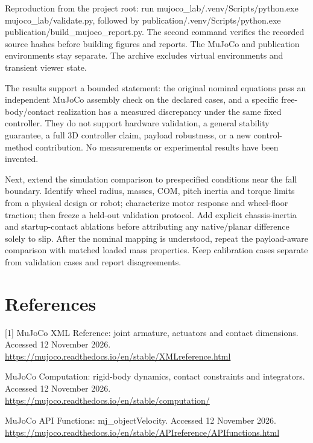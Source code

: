\documentclass[11pt,a4paper]{article}
\begin{document}
Reproduction from the project root: run mujoco\_lab/.venv/Scripts/python.exe mujoco\_lab/validate.py, followed by publication/.venv/Scripts/python.exe publication/build\_mujoco\_report.py. The second command verifies the recorded source hashes before building figures and reports. The MuJoCo and publication environments stay separate. The archive excludes virtual environments and transient viewer state.

The results support a bounded statement: the original nominal equations pass an independent MuJoCo assembly check on the declared cases, and a specific free-body/contact realization has a measured discrepancy under the same fixed controller. They do not support hardware validation, a general stability guarantee, a full 3D controller claim, payload robustness, or a new control-method contribution. No measurements or experimental results have been invented.

Next, extend the simulation comparison to prespecified conditions near the fall boundary. Identify wheel radius, masses, COM, pitch inertia and torque limits from a physical design or robot; characterize motor response and wheel-floor traction; then freeze a held-out validation protocol. Add explicit chassis-inertia and startup-contact ablations before attributing any native/planar difference solely to slip. After the nominal mapping is understood, repeat the payload-aware comparison with matched loaded mass properties. Keep calibration cases separate from validation cases and report disagreements.

\section*{References}
[1] MuJoCo XML Reference: joint armature, actuators and contact dimensions. Accessed 12 November 2026. \url{https://mujoco.readthedocs.io/en/stable/XMLreference.html}\par
[2] MuJoCo Computation: rigid-body dynamics, contact constraints and integrators. Accessed 12 November 2026. \url{https://mujoco.readthedocs.io/en/stable/computation/}\par
[3] MuJoCo API Functions: mj\_objectVelocity. Accessed 12 November 2026. \url{https://mujoco.readthedocs.io/en/stable/APIreference/APIfunctions.html}\par
\end{document}
